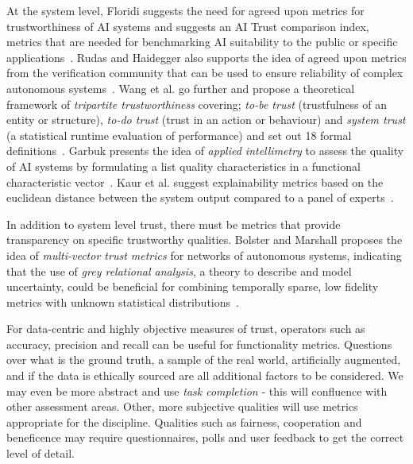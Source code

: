 At the system level, Floridi suggests the need for agreed upon metrics for trustworthiness of AI systems and suggests an  AI Trust comparison index, metrics that are needed for benchmarking AI suitability to the public or specific applications~\cite{Floridi2018}. 
%
Rudas and Haidegger also supports the idea of agreed upon metrics from the verification community that can be used to ensure reliability of complex autonomous systems~\cite{Rudas2020}. Wang et al. go further and propose a theoretical framework of \emph{tripartite trustworthiness} covering; \emph{to-be trust} (trustfulness of an entity or structure), \emph{to-do trust} (trust in an action or behaviour) and \emph{system trust} (a statistical runtime evaluation of performance) and set out 18 formal definitions~\cite{Wang2020}. 
%
Garbuk presents the idea of \emph{applied intellimetry} to assess the quality of AI systems by formulating a list quality characteristics in a functional characteristic vector~\cite{garbuk2018intellimetry}. 
%
Kaur et al. suggest explainability metrics based on the euclidean distance between the system output compared to a panel of experts~\cite{kaur2021trustworthy}. 
%


In addition to system level trust, there must be metrics that provide transparency on specific trustworthy qualities. 
%
Bolster and Marshall proposes the idea of \emph{multi-vector trust metrics} for networks of autonomous systems, indicating that the use of \emph{grey relational analysis}, a theory to describe and model uncertainty, could be beneficial for combining temporally sparse, low fidelity metrics with unknown statistical distributions~\cite{Bolster2014}. 

For data-centric and highly objective measures of trust, operators such as accuracy, precision and recall can be useful for functionality metrics. Questions over what is the ground truth, a sample of the real world, artificially augmented, and if the data is ethically sourced are all additional factors to be considered. We may even be more abstract and use \emph{task completion} - this will confluence with other assessment areas. 
%
Other, more subjective qualities will use metrics appropriate for the discipline. Qualities such as fairness, cooperation and beneficence may require questionnaires, polls and user feedback to get the correct level of detail. 
%


